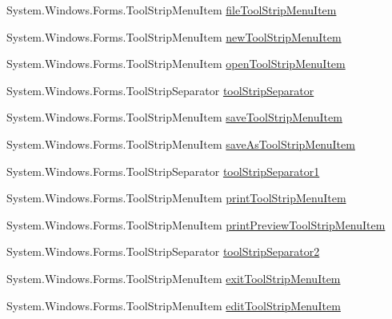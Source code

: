 \begin{DoxyCompactItemize}
\item 
\-System.\-Windows.\-Forms.\-Tool\-Strip\-Menu\-Item \hyperlink{class_sr_p___classroom_inq_1_1frm_classrrom_inq_a4aac2987ba1f61ee4bde4d91cdf35476}{file\-Tool\-Strip\-Menu\-Item}
\item 
\-System.\-Windows.\-Forms.\-Tool\-Strip\-Menu\-Item \hyperlink{class_sr_p___classroom_inq_1_1frm_classrrom_inq_ac3197c0c505ec97395ace77a88a8c068}{new\-Tool\-Strip\-Menu\-Item}
\item 
\-System.\-Windows.\-Forms.\-Tool\-Strip\-Menu\-Item \hyperlink{class_sr_p___classroom_inq_1_1frm_classrrom_inq_aabb3ca13577ddb31c75bcd459c075263}{open\-Tool\-Strip\-Menu\-Item}
\item 
\-System.\-Windows.\-Forms.\-Tool\-Strip\-Separator \hyperlink{class_sr_p___classroom_inq_1_1frm_classrrom_inq_a442caa4a21bb4dac8b91d82e24bec584}{tool\-Strip\-Separator}
\item 
\-System.\-Windows.\-Forms.\-Tool\-Strip\-Menu\-Item \hyperlink{class_sr_p___classroom_inq_1_1frm_classrrom_inq_a7e580a014ae78cc9e8d2ce621a2541f3}{save\-Tool\-Strip\-Menu\-Item}
\item 
\-System.\-Windows.\-Forms.\-Tool\-Strip\-Menu\-Item \hyperlink{class_sr_p___classroom_inq_1_1frm_classrrom_inq_a660ffe654aa61a06b147d2220fc5c75d}{save\-As\-Tool\-Strip\-Menu\-Item}
\item 
\-System.\-Windows.\-Forms.\-Tool\-Strip\-Separator \hyperlink{class_sr_p___classroom_inq_1_1frm_classrrom_inq_a3bec3b534d141382d4525a9be840e911}{tool\-Strip\-Separator1}
\item 
\-System.\-Windows.\-Forms.\-Tool\-Strip\-Menu\-Item \hyperlink{class_sr_p___classroom_inq_1_1frm_classrrom_inq_ab2355ecf8174002162a103a7e7ee83f4}{print\-Tool\-Strip\-Menu\-Item}
\item 
\-System.\-Windows.\-Forms.\-Tool\-Strip\-Menu\-Item \hyperlink{class_sr_p___classroom_inq_1_1frm_classrrom_inq_a56c14d36b467c4787937369037c22717}{print\-Preview\-Tool\-Strip\-Menu\-Item}
\item 
\-System.\-Windows.\-Forms.\-Tool\-Strip\-Separator \hyperlink{class_sr_p___classroom_inq_1_1frm_classrrom_inq_aa51d7952b4dde9caa9d7e111353a2047}{tool\-Strip\-Separator2}
\item 
\-System.\-Windows.\-Forms.\-Tool\-Strip\-Menu\-Item \hyperlink{class_sr_p___classroom_inq_1_1frm_classrrom_inq_a676112a698472361a000699f774d38ca}{exit\-Tool\-Strip\-Menu\-Item}
\item 
\-System.\-Windows.\-Forms.\-Tool\-Strip\-Menu\-Item \hyperlink{class_sr_p___classroom_inq_1_1frm_classrrom_inq_a3e1d074025f88cab6f1911c123de6abb}{edit\-Tool\-Strip\-Menu\-Item}

\end{DoxyCompactItemize}
